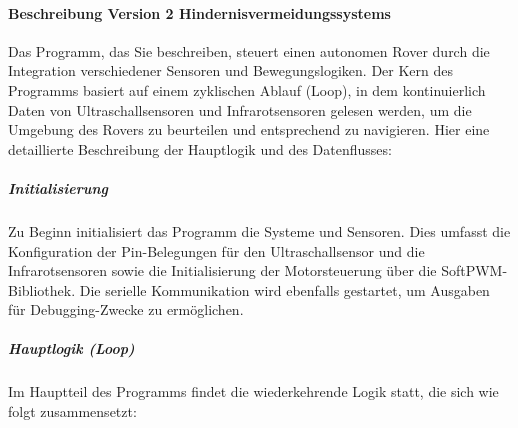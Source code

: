 \documentclass{vorlage-design-main}
\begin{document}
\newpage

\hypertarget{beschreibung-version-2-hindernisvermeidungssystems}{%
\paragraph{Beschreibung Version 2
Hindernisvermeidungssystems}\label{beschreibung-version-2-hindernisvermeidungssystems}}

Das Programm, das Sie beschreiben, steuert einen autonomen Rover durch
die Integration verschiedener Sensoren und Bewegungslogiken. Der Kern
des Programms basiert auf einem zyklischen Ablauf (Loop), in dem
kontinuierlich Daten von Ultraschallsensoren und Infrarotsensoren
gelesen werden, um die Umgebung des Rovers zu beurteilen und
entsprechend zu navigieren. Hier eine detaillierte Beschreibung der
Hauptlogik und des Datenflusses:

\hypertarget{initialisierung-1}{%
\subparagraph{Initialisierung}\label{initialisierung-1}}

Zu Beginn initialisiert das Programm die Systeme und Sensoren. Dies
umfasst die Konfiguration der Pin-Belegungen für den Ultraschallsensor
und die Infrarotsensoren sowie die Initialisierung der Motorsteuerung
über die SoftPWM-Bibliothek. Die serielle Kommunikation wird ebenfalls
gestartet, um Ausgaben für Debugging-Zwecke zu ermöglichen.

\hypertarget{hauptlogik-loop}{%
\subparagraph{Hauptlogik (Loop)}\label{hauptlogik-loop}}

Im Hauptteil des Programms findet die wiederkehrende Logik statt, die
sich wie folgt zusammensetzt:
\end{document}
